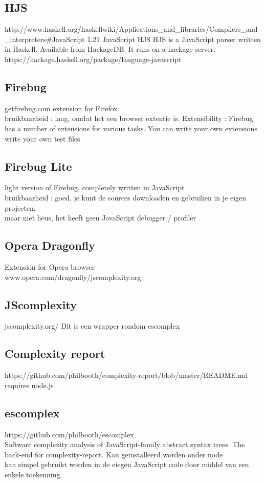 \documentclass{article}
\begin{document}
\subsection{HJS}
http://www.haskell.org/haskellwiki/Applications\_and\_libraries/Compilers\_and\_interpreters\#JavaScript
1.21 JavaScript
HJS
HJS is a JavaScript parser written in Haskell. Available from HackageDB.
It runs on a hackage server.
https://hackage.haskell.org/package/language-javascript

\subsection{Firebug}
getfirebug.com
extension for Firefox\\
bruikbaarheid : laag, omdat het een browser extentie is.
Extensibility : Firebug has a number of extensions for various tasks. You can write your own extensions.
write your own test files

\subsection {Firebug Lite}
light version of Firebug, completely written in JavaScript\\
bruikbaarheid : goed, je kunt de sources downloaden en gebruiken in je eigen projecten.\\
maar niet heus, het heeft geen JavaScript debugger / profiler

\subsection{Opera Dragonfly}
Extension for Opera browser\\
www.opera.com/dragonfly/jscomplexity.org

\subsection{JScomplexity}jscomplexity.org/
Dit is een wrapper rondom escomplex

\subsection{Complexity report}
https://github.com/philbooth/complexity-report/blob/master/README.md   requires node.js

\subsection{escomplex}
https://github.com/philbooth/escomplex\\
Software complexity analysis of JavaScript-family abstract syntax trees. The back-end for complexity-report.
Kan geinstalleerd worden onder node\\
kan simpel gebruikt worden in de eiegen JavaScript code door middel van een enkele toekenning.\\
\end{document}
